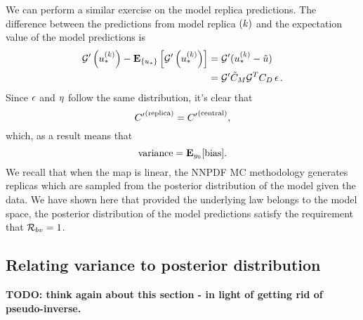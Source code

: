 We can perform a similar exercise on the model replica predictions. The difference
between the predictions from model replica $(k)$ and the expectation value
of the model predictions is
\begin{equation}
    \begin{split}
        {{\mathcal{G}}^{\prime}}\left(u_*^{(k)}\right) -
        \mathbf{E}_{\{ u_* \}} \left[ {{\mathcal{G}}^{\prime}}\left(u_*^{(k)}\right) \right] &=
        {{\mathcal{G}}^{\prime}} (u_*^{(k)} - \tilde{u}) \\
        &= {{\mathcal{G}}^{\prime}} \tilde{C}_M \mathcal{G}^T C_{D} \, \epsilon \, .
    \end{split}
\end{equation}
Since $\epsilon$ and $\eta$ follow the same distribution, it's clear that
\begin{equation}
    {{C}^{\prime}}^{(\rm replica)} = {{C}^{\prime}}^{(\rm central)},
\end{equation}
which, as a result means that
\begin{equation}
    {\rm variance} = \mathbf{E}_{y_0}[{\rm bias}].
\end{equation}
We recall that when the map is linear, the NNPDF MC methodology generates replicas
which are sampled from the posterior distribution of the model given the data.
We have shown here that provided the underlying law belongs to the model
space, the posterior distribution of the model predictions satisfy the
requirement that $\mathcal{R}_{bv} = 1$.

\subsection{Relating variance to posterior distribution}

{\bf TODO: think again about this section - in light of getting rid of pseudo-inverse.}

